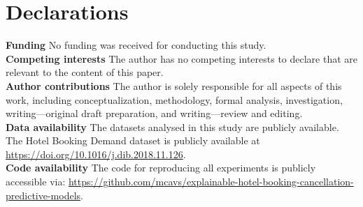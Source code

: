 \documentclass[pdflatex,iicol,sn-mathphys-ay]{sn-jnl}
\theoremstyle{thmstyleone}%
\theoremstyle{thmstyletwo}%
\theoremstyle{thmstylethree}%
\begin{document}
\section*{Declarations}

\textbf{Funding} No funding was received for conducting this study.\\

\noindent \textbf{Competing interests} The author has no competing interests to declare that are relevant to the content of this paper.\\

\noindent \textbf{Author contributions} The author is solely responsible for all aspects of this work, including conceptualization, methodology, formal analysis, investigation, writing---original draft preparation, and writing---review and editing.\\

\noindent \textbf{Data availability} The datasets analysed in this study are publicly available. The Hotel Booking Demand dataset is publicly available at \url{https://doi.org/10.1016/j.dib.2018.11.126}.\\

\noindent \textbf{Code availability} The code for reproducing all experiments is publicly accessible via: \url{https://github.com/mcavs/explainable-hotel-booking-cancellation-predictive-models}.


\end{document}
